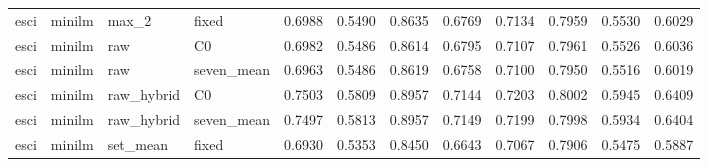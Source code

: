\begin{longtable}{llllrrrrrrrr}
esci & minilm & max\_2 & fixed & 0.6988 & 0.5490 & 0.8635 & 0.6769 & 0.7134 & 0.7959 & 0.5530 & 0.6029 \\
esci & minilm & raw & C0 & 0.6982 & 0.5486 & 0.8614 & 0.6795 & 0.7107 & 0.7961 & 0.5526 & 0.6036 \\
esci & minilm & raw & seven\_mean & 0.6963 & 0.5486 & 0.8619 & 0.6758 & 0.7100 & 0.7950 & 0.5516 & 0.6019 \\
esci & minilm & raw\_hybrid & C0 & 0.7503 & 0.5809 & 0.8957 & 0.7144 & 0.7203 & 0.8002 & 0.5945 & 0.6409 \\
esci & minilm & raw\_hybrid & seven\_mean & 0.7497 & 0.5813 & 0.8957 & 0.7149 & 0.7199 & 0.7998 & 0.5934 & 0.6404 \\
esci & minilm & set\_mean & fixed & 0.6930 & 0.5353 & 0.8450 & 0.6643 & 0.7067 & 0.7906 & 0.5475 & 0.5887 \\
\end{longtable}
